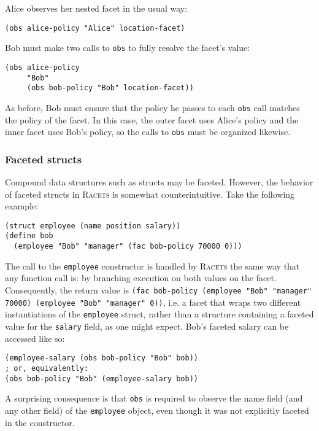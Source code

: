 \documentclass{article}
\begin{document}
Alice observes her nested facet in the usual way:

\begin{lstlisting}
(obs alice-policy "Alice" location-facet)
\end{lstlisting}

Bob must make two calls to \texttt{obs} to fully resolve the facet's value:

\begin{lstlisting}
(obs alice-policy
     "Bob"
     (obs bob-policy "Bob" location-facet))
\end{lstlisting}

As before, Bob must ensure that the policy he passes to each \texttt{obs} call matches the policy of the facet. In this case, the outer facet uses Alice's policy and the inner facet uses Bob's policy, so the calls to \texttt{obs} must be organized likewise.


\subsubsection{Faceted structs}
Compound data structures such as structs may be faceted. However, the behavior of faceted structs in \textsc{Racets} is somewhat counterintuitive. Take the following example:

\begin{lstlisting}
(struct employee (name position salary))
(define bob
  (employee "Bob" "manager" (fac bob-policy 70000 0)))
\end{lstlisting}

The call to the \texttt{employee} constructor is handled by \textsc{Racets} the same way that any function call is: by branching execution on both values on the facet. Consequently, the return value is \texttt{(fac bob-policy (employee "Bob" "manager" 70000) (employee "Bob" "manager" 0))}, i.e. a facet that wraps two different instantiations of the \texttt{employee} struct, rather than a structure containing a faceted value for the \texttt{salary} field, as one might expect. Bob's faceted salary can be accessed like so:

\begin{lstlisting}
(employee-salary (obs bob-policy "Bob" bob))
; or, equivalently:
(obs bob-policy "Bob" (employee-salary bob))
\end{lstlisting}

A surprising consequence is that \texttt{obs} is required to observe the name field (and any other field) of the \texttt{employee} object, even though it was not explicitly faceted in the constructor.
\end{document}
